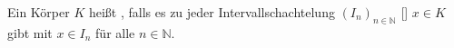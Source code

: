 Ein Körper $K$ heißt , falls es zu jeder Intervallschachtelung $(I_n)_{n \in \mathbb{N}}$ [] $x \in K$ gibt mit $x \in I_n$ für alle $n \in \mathbb{N}$.